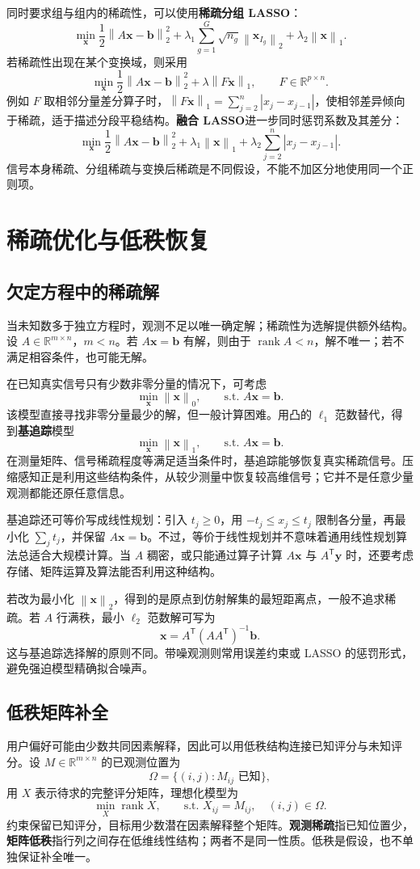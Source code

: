 \documentclass[UTF8,fontset=fandol,a4paper,12pt]{ctexart}
\newcommand{\R}{\mathbb R}
\newcommand{\rank}{\operatorname{rank}}
\newcommand{\vx}{\boldsymbol x}
\newcommand{\vb}{\boldsymbol b}
\newcommand{\norm}[1]{\left\lVert#1\right\rVert}
\theoremstyle{definition}
\begin{document}
同时要求组与组内的稀疏性，可以使用\textbf{稀疏分组 LASSO}：
\[
 \min_{\vx}\frac12\norm{A\vx-\vb}_2^2
 +\lambda_1\sum_{g=1}^G\sqrt{n_g}\norm{\vx_{I_g}}_2
 +\lambda_2\norm{\vx}_1.
\]
若稀疏性出现在某个变换域，则采用
\[
 \min_{\vx}\frac12\norm{A\vx-\vb}_2^2+\lambda\norm{F\vx}_1,
 \qquad F\in\R^{p\times n}.
\]
例如 $F$ 取相邻分量差分算子时，$\norm{F\vx}_1=\sum_{j=2}^n|x_j-x_{j-1}|$，使相邻差异倾向于稀疏，适于描述分段平稳结构。\textbf{融合 LASSO}进一步同时惩罚系数及其差分：
\[
 \min_{\vx}\frac12\norm{A\vx-\vb}_2^2
 +\lambda_1\norm{\vx}_1
 +\lambda_2\sum_{j=2}^n|x_j-x_{j-1}|.
\]
信号本身稀疏、分组稀疏与变换后稀疏是不同假设，不能不加区分地使用同一个正则项。

\section{稀疏优化与低秩恢复}
\subsection{欠定方程中的稀疏解}
当未知数多于独立方程时，观测不足以唯一确定解；稀疏性为选解提供额外结构。设 $A\in\R^{m\times n}$，$m<n$。若 $A\vx=\vb$ 有解，则由于 $\rank A<n$，解不唯一；若不满足相容条件，也可能无解。

在已知真实信号只有少数非零分量的情况下，可考虑
\[
 \min_{\vx}\norm{\vx}_0,\qquad\text{s.t. }A\vx=\vb.
\]
该模型直接寻找非零分量最少的解，但一般计算困难。用凸的 $\ell_1$ 范数替代，得到\textbf{基追踪}模型
\[
 \boxed{\min_{\vx}\norm{\vx}_1,\qquad\text{s.t. }A\vx=\vb.}
\]
在测量矩阵、信号稀疏程度等满足适当条件时，基追踪能够恢复真实稀疏信号。压缩感知正是利用这些结构条件，从较少测量中恢复较高维信号；它并不是任意少量观测都能还原任意信息。

基追踪还可等价写成线性规划：引入 $t_j\ge0$，用 $-t_j\le x_j\le t_j$ 限制各分量，再最小化 $\sum_j t_j$，并保留 $A\vx=\vb$。不过，等价于线性规划并不意味着通用线性规划算法总适合大规模计算。当 $A$ 稠密，或只能通过算子计算 $A\vx$ 与 $A^{\mathsf T}\boldsymbol y$ 时，还要考虑存储、矩阵运算及算法能否利用这种结构。

若改为最小化 $\norm{\vx}_2$，得到的是原点到仿射解集的最短距离点，一般不追求稀疏。若 $A$ 行满秩，最小 $\ell_2$ 范数解可写为
\[
 \vx=A^{\mathsf T}(AA^{\mathsf T})^{-1}\vb.
\]
这与基追踪选择解的原则不同。带噪观测则常用误差约束或 LASSO 的惩罚形式，避免强迫模型精确拟合噪声。

\subsection{低秩矩阵补全}\label{sec:lowrank}
用户偏好可能由少数共同因素解释，因此可以用低秩结构连接已知评分与未知评分。设 $M\in\R^{m\times n}$ 的已观测位置为
\[
 \Omega=\{(i,j):M_{ij}\text{ 已知}\},
\]
用 $X$ 表示待求的完整评分矩阵，理想化模型为
\[
 \boxed{\min_X\rank X,\qquad
 \text{s.t. }X_{ij}=M_{ij},\quad(i,j)\in\Omega.}
\]
约束保留已知评分，目标用少数潜在因素解释整个矩阵。\textbf{观测稀疏}指已知位置少，\textbf{矩阵低秩}指行列之间存在低维线性结构；两者不是同一性质。低秩是假设，也不单独保证补全唯一。
\end{document}
